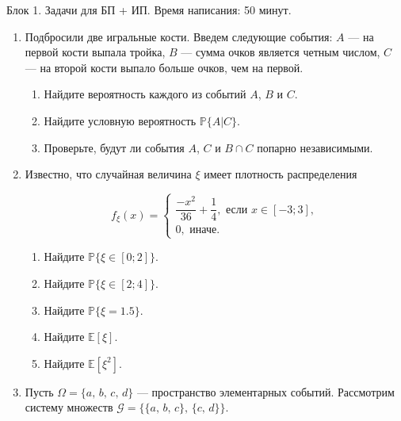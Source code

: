 \documentclass[12pt]{article}
\begin{document}
Блок 1. Задачи для БП + ИП. Время написания: 50 минут. 

\begin{enumerate}
\item Подбросили две игральные кости. 
Введем следующие события: $A$ — на первой кости выпала тройка, 
$B$ — сумма очков является четным числом, $C$ — на второй кости выпало больше очков, чем на первой.

\begin{enumerate}

    \item Найдите вероятность каждого из событий $A$, $B$ и  $C$.

    \item Найдите условную вероятность $\mathbb{P}\{A|C\}$.

    \item Проверьте, будут ли события $A$, $C$ и $B \cap C$ попарно независимыми.

\end{enumerate}

\item Известно, что случайная величина $\xi$ имеет плотность распределения

\[f_{\xi}(x) = 
\begin{cases}
\dfrac{-x^2}{36} + \dfrac{1}{4}, \text{ если } x \in [-3; 3], \\
0, \text{ иначе}.
\end{cases}
\]

    \begin{enumerate}

    \item Найдите $\mathbb{P}\{\xi \in [0; 2]\}$.

    \item Найдите $\mathbb{P}\{\xi \in [2; 4]\}$.

    \item Найдите $\mathbb{P}\{\xi = 1.5\}$.

    \item Найдите $\mathbb{E}[\xi]$.

    \item Найдите $\mathbb{E}[\xi^2]$.

\end{enumerate}


\item Пусть $\Omega = \{a, \, b, \, c, \, d\}$ — пространство элементарных событий. 
Рассмотрим систему множеств $\mathcal{G} = \bigl\{ \{a, \, b, \, c\}, \, \{c, \, d\}\bigr\}$.


\end{enumerate}
\end{document}
